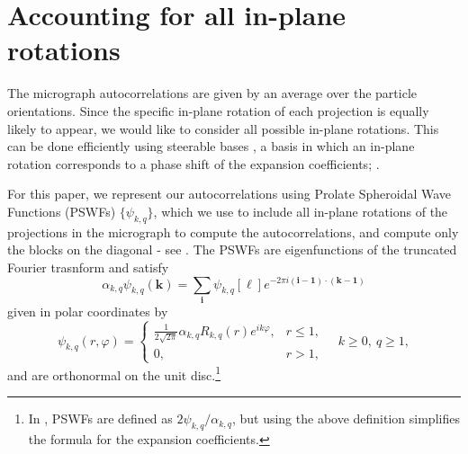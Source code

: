 \documentclass[english,11pt]{article}
\newcommand{\1}{\mathbf{1}}
\newcommand{\mb}{\mathbf}
\newcommand*\Bell{\ensuremath{\boldsymbol\ell}}
\numberwithin{equation}{section}
\theoremstyle{plain}
\theoremstyle{definition}
\theoremstyle{remark}
\theoremstyle{plain}
\theoremstyle{remark}
\theoremstyle{plain}
\theoremstyle{plain}
\newcommand{\be}{\begin{equation}}
\newcommand{\ee}{\end{equation}}
\begin{document}
\section{Accounting for all in-plane rotations} \label{sec:steering}

The micrograph autocorrelations are given by an average over the particle orientations.
Since the specific in-plane rotation of each projection is equally likely to appear, we would like to   consider all possible in-plane rotations. 
This can be done efficiently using steerable bases , a basis in which an in-plane rotation corresponds to a phase shift of the expansion coefficients;  \cite{bhamre2016denoising,landa2017steerable,zhao2016fast}.

For this paper, we represent our autocorrelations using Prolate Spheroidal Wave Functions (PSWFs) $\{\psi_{k,q}\}$, which we use to include all in-plane rotations of the projections in the micrograph to compute the autocorrelations, and compute only the blocks on the diagonal - see \cite{landa2017steerable}. The PSWFs are eigenfunctions of the truncated Fourier trasnform and satisfy
\be\label{eq:PSWF_defn_eq}
\alpha_{k,q}\psi_{k,q}(\mb k) = \sum_{\mb i}\psi_{k,q}[\Bell]e^{-2\pi i (\mb i-\mb 1)\cdot(\mb k - \mb 1)}
\ee
given in polar coordinates by
\[ \psi_{k,q}(r,\varphi) = \left\{\begin{array}{ll} \frac{1}{2\sqrt{2\pi}}\alpha_{k,q}R_{k,q}(r)e^{ik\varphi}, & r\leq 1,\\ 0, & r>1,\end{array}\right. \quad k\geq 0,\ q\geq 1,\]
and are orthonormal on the unit disc.\footnote{In \cite{landa2017steerable}, PSWFs are defined as $2\psi_{k,q}/\alpha_{k,q}$, but using the above definition simplifies the formula for the expansion coefficients.}
\end{document}
